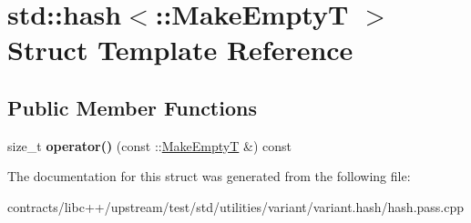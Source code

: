 \hypertarget{structstd_1_1hash_3_1_1_make_empty_t_01_4}{}\section{std\+:\+:hash$<$\+:\+:Make\+EmptyT $>$ Struct Template Reference}
\label{structstd_1_1hash_3_1_1_make_empty_t_01_4}
\subsection*{Public Member Functions}
\begin{DoxyCompactItemize}
\item 
\mbox{\label{structstd_1_1hash_3_1_1_make_empty_t_01_4_acc1a0b189ab8ef314c6e5466b0895aef}} 
size\+\_\+t {\bfseries operator()} (const \+::\mbox{\hyperlink{struct_make_empty_t}{Make\+EmptyT}} \&) const
\end{DoxyCompactItemize}


The documentation for this struct was generated from the following file\+:\begin{DoxyCompactItemize}
\item 
contracts/libc++/upstream/test/std/utilities/variant/variant.\+hash/hash.\+pass.\+cpp\end{DoxyCompactItemize}
